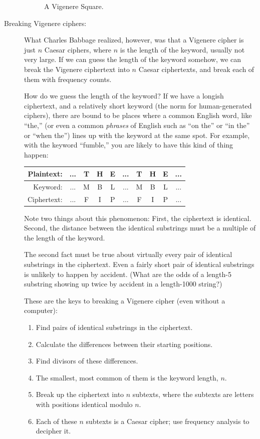 \documentclass{article}
\begin{document}
\begin{description}
\begin{figure}
\caption{A Vigenere Square.}
\label{vigeneresquare}
\end{figure}

\item[Breaking Vigenere ciphers:]  What Charles Babbage realized,
  however, was that a Vigenere cipher is just $n$ Caesar ciphers,
  where $n$ is the length of the keyword, usually not very large.  If
  we can guess the length of the keyword somehow, we can break the
  Vigenere ciphertext into $n$ Caesar ciphertexts, and break each of
  them with frequency counts.  

  How do we guess the length of the keyword?  If we have a longish
  ciphertext, and a relatively short keyword (the norm for
  human-generated ciphers), there are bound to be
  places where a common English word, like ``the,'' (or even a common
  {\em phrases} of English such as ``on the'' or ``in the'' or ``when
  the'') lines up with the keyword at the same spot.  For example,
  with the keyword ``fumble,'' you are likely to have this kind of
  thing happen:

  \begin{tabular}{|r|c|c|c|c|c|c|c|c|c|}\hline
Plaintext: &    ... & T & H & E & ... & T & H & E & ...\\\hline
Keyword: &      ... & M & B & L & ... & M & B & L & ...\\\hline
Ciphertext: &   ... & F & I & P & ... & F & I & P & ...\\\hline
\end{tabular}


Note two things about this phenomenon: First, the ciphertext is
identical.  Second, the distance between the identical substrings must
be a multiple of the length of the keyword.

The second fact must be 
true about virtually every pair of identical substrings in the
ciphertext.  Even a fairly short pair of identical substrings is
unlikely to happen by accident. (What are the odds of a length-5
substring showing up twice by accident in a length-1000 string?)

These are the keys to breaking a Vigenere cipher (even without a
computer):
\begin{enumerate}
\item Find pairs of identical substrings in the ciphertext.
\item Calculate the differences between their starting positions.
\item Find divisors of these differences.
\item The smallest, most common of them is the keyword length, $n$.
\item Break up the ciphertext into $n$ subtexts, where the subtexts
  are letters with positions identical modulo $n$.
\item Each of these $n$ subtexts is a Caesar cipher; use frequency
  analysis to decipher it.
\end{enumerate}


\end{description}
\end{document}
